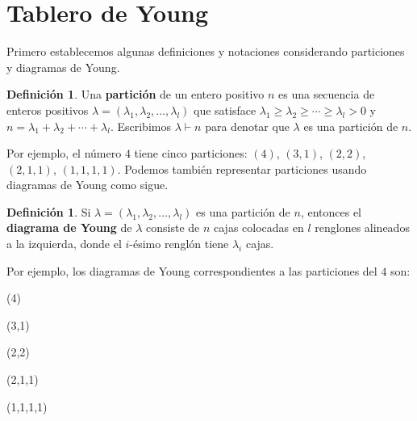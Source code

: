 \documentclass[12pt]{book}
\theoremstyle{definition}
\newtheorem{definition}[theorem]{Definición}
\newcounter{in}
\newcounter{ini}
\begin{document}
\section{Tablero de Young}
\label{tablero}

Primero establecemos algunas definiciones y notaciones
considerando particiones y diagramas de Young.

\begin{definition}
  Una \textbf{partición} de un entero positivo $n$ es una secuencia de
  enteros positivos
  $\lambda=(\lambda_{1},\lambda_{2},\ldots,\lambda_{l})$ que satisface
  $\lambda_{1}\geq\lambda_{2}\geq\cdots\geq\lambda_{l}>0$ y
  $n=\lambda_{1}+\lambda_{2}+\cdots+\lambda_{l}$. Escribimos
  $\lambda\vdash n$ para denotar que $\lambda$ es una partición de $n$.
\end{definition}

Por ejemplo, el número $4$ tiene cinco particiones: $(4)$, $(3,1)$,
$(2,2)$, $(2,1,1)$, $(1,1,1,1)$. Podemos también representar
particiones usando diagramas de Young como sigue.

\begin{definition}
  Si $\lambda=(\lambda_{1},\lambda_{2},\ldots,\lambda_{l})$ es una
  partición de $n$, entonces el \textbf{diagrama de Young} de $\lambda$
  consiste de $n$ cajas colocadas en $l$ renglones alineados a la
  izquierda, donde el $i$-ésimo
  renglón tiene  $\lambda_{i}$ cajas.
\end{definition}

Por ejemplo, los diagramas de Young correspondientes a las particiones
del $4$ son: 

\begin{center}
  \begin{minipage}[h]{0.2\linewidth}
    \centering {}\bigskip

    (4)
  \end{minipage}
  \begin{minipage}[h]{0.15\linewidth}
    \centering {}\medskip

    (3,1)
  \end{minipage}
  \begin{minipage}[h]{0.15\linewidth}
    \centering {}\medskip

    (2,2)
  \end{minipage}
  \begin{minipage}[h]{0.15\linewidth}
    \centering {}\smallskip

    (2,1,1)
  \end{minipage}
  \begin{minipage}[h]{0.15\linewidth}
    \centering {}\smallskip

    (1,1,1,1)
  \end{minipage}
\end{center}
\end{document}
